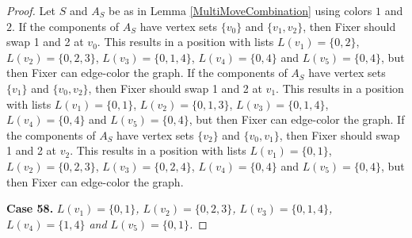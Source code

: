 \documentclass[12pt]{amsart}
\theoremstyle{plain}
\theoremstyle{definition}
\theoremstyle{remark}
\begin{document}
\begin{proof}
Let $S$ and $A_S$ be as in Lemma \ref{MultiMoveCombination} using colors $1$ and $2$. If the components of $A_S$ have vertex sets $\{v_0\}$ and $\{v_1, v_2\}$, then Fixer should swap 1 and 2 at $v_0$. This results in a position with lists $L(v_1) = \{0, 2\}$, $L(v_2) = \{0, 2, 3\}$, $L(v_3) = \{0, 1, 4\}$, $L(v_4) = \{0, 4\}$ and $L(v_5) = \{0, 4\}$, but then Fixer can edge-color the graph.
If the components of $A_S$ have vertex sets $\{v_1\}$ and $\{v_0, v_2\}$, then Fixer should swap 1 and 2 at $v_1$. This results in a position with lists $L(v_1) = \{0, 1\}$, $L(v_2) = \{0, 1, 3\}$, $L(v_3) = \{0, 1, 4\}$, $L(v_4) = \{0, 4\}$ and $L(v_5) = \{0, 4\}$, but then Fixer can edge-color the graph.
If the components of $A_S$ have vertex sets $\{v_2\}$ and $\{v_0, v_1\}$, then Fixer should swap 1 and 2 at $v_2$. This results in a position with lists $L(v_1) = \{0, 1\}$, $L(v_2) = \{0, 2, 3\}$, $L(v_3) = \{0, 2, 4\}$, $L(v_4) = \{0, 4\}$ and $L(v_5) = \{0, 4\}$, but then Fixer can edge-color the graph.

\noindent\textbf{Case 58.  }\textit{$L(v_1) = \{0, 1\}$, $L(v_2) = \{0, 2, 3\}$, $L(v_3) = \{0, 1, 4\}$, $L(v_4) = \{1, 4\}$ and $L(v_5) = \{0, 1\}$.}


\end{proof}
\end{document}
